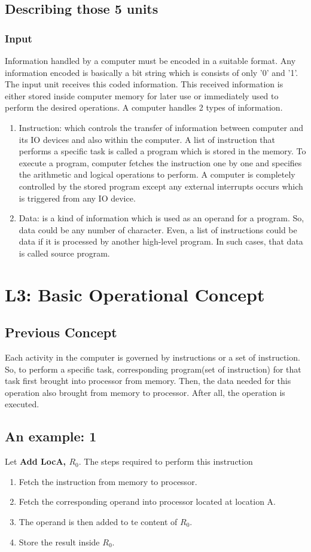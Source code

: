 \documentclass[12 pt, letterpaper]{extarticle}
\begin{document}
\subsection*{Describing those 5 units}
\subsubsection*{Input}
Information handled by a computer must be encoded in a suitable format.
Any information encoded is basically a bit string which is consists of only '0' and '1'.
The input unit receives this coded information. This received information is either stored inside computer memory for later use or immediately used to perform the desired operations.
A computer handles 2 types of information.
\begin{enumerate}
	\item Instruction: which controls the transfer of information between computer and its IO devices and also within the computer. A list of instruction that performs a specific task is called a program which is stored in the memory. To execute a program, computer fetches the instruction one by one and specifies the arithmetic and logical operations to perform. A computer is completely controlled by the stored program except any external interrupts occurs which is triggered from any IO device.
	\item Data: is a kind of information which is used as an operand for a program. So, data could be any number of character. Even, a list of instructions could be data if it is processed by another high-level program. In such cases, that data is called source program.
\end{enumerate}

\section*{L3: Basic Operational Concept}
\subsection*{Previous Concept}
Each activity in the computer is governed by instructions or a set of instruction.
So, to perform a specific task, corresponding program(set of instruction) for that task first brought into processor from memory.
Then, the data needed for this operation also brought from memory to processor. After all, the operation is executed.

\subsection*{An example: 1}
Let \textbf{Add LocA, $R_0$}. The steps required to perform this instruction \\
\begin{enumerate}
	\item Fetch the instruction from memory to processor.
	\item Fetch the corresponding operand into processor located at location A.
	\item The operand is then added to te content of $R_0$.
	\item Store the result inside $R_0$.
\end{enumerate}
\end{document}
